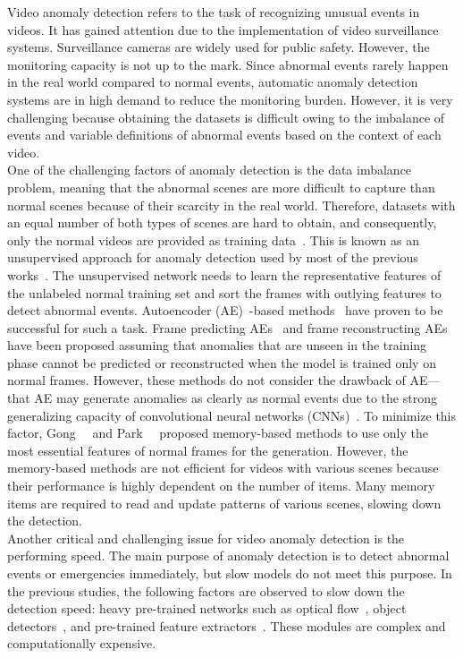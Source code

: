 \documentclass[10pt,twocolumn,letterpaper]{article}
\begin{document}
Video anomaly detection refers to the task of recognizing unusual events in videos. It has gained attention due to the implementation of video surveillance systems. Surveillance cameras are widely used for public safety. However, the monitoring capacity is not up to the mark. Since abnormal events rarely happen in the real world compared to normal events, automatic anomaly detection systems are in high demand to reduce the monitoring burden. However, it is very challenging because obtaining the datasets is difficult owing to the imbalance of events and variable definitions of abnormal events based on the context of each video. \\
\indent One of the challenging factors of anomaly detection is the data imbalance problem, meaning that the abnormal scenes are more difficult to capture than normal scenes because of their scarcity in the real world. Therefore, datasets with an equal number of both types of scenes are hard to obtain, and consequently, only the normal videos are provided as training data~\cite{10.1145/1541880.1541882}. This is known as an unsupervised approach for anomaly detection used by most of the previous works~\cite{hasan2016learning, Nguyen_2019_ICCV,  ravanbakhsh2017abnormal, ravanbakhsh2019training}. The unsupervised network needs to learn the representative features of the unlabeled normal training set and sort the frames with outlying features to detect abnormal events. Autoencoder (AE)~\cite{hinton2006reducing}-based methods~\cite{Abati_2019_CVPR, zaheer2020old, Liu_2018_CVPR} have proven to be successful for such a task. Frame predicting AEs~\cite{Liu_2018_CVPR, tang2020integrating} and frame reconstructing AEs~\cite{nguyen2019hybrid, hasan2016learning} have been proposed assuming that anomalies that are unseen in the training phase cannot be predicted or reconstructed when the model is trained only on normal frames. However, these methods do not consider the drawback of AE—that AE may generate anomalies as clearly as normal events due to the strong generalizing capacity of convolutional neural networks (CNNs)~\cite{gong2019memorizing}. To minimize this factor, Gong~\etal~\cite{gong2019memorizing} and Park~\etal~\cite{park2020learning} proposed memory-based methods to use only the most essential features of normal frames for the generation. However, the memory-based methods are not efficient for videos with various scenes because their performance is highly dependent on the number of items. Many memory items are required to read and update patterns of various scenes, slowing down the detection.\\
\indent Another critical and challenging issue for video anomaly detection is the performing speed. The main purpose of anomaly detection is to detect abnormal events or emergencies immediately, but slow models do not meet this purpose. In the previous studies, the following factors are observed to slow down the detection speed: heavy pre-trained networks such as optical flow~\cite{Liu_2018_CVPR, ravanbakhsh2017abnormal, ravanbakhsh2019training, yu2020cloze}, object detectors~\cite{georgescu2021anomaly, ionescu2019object}, and pre-trained feature extractors~\cite{ravanbakhsh2018plug, sultani2018real}. These modules are complex and computationally expensive. 
\end{document}
